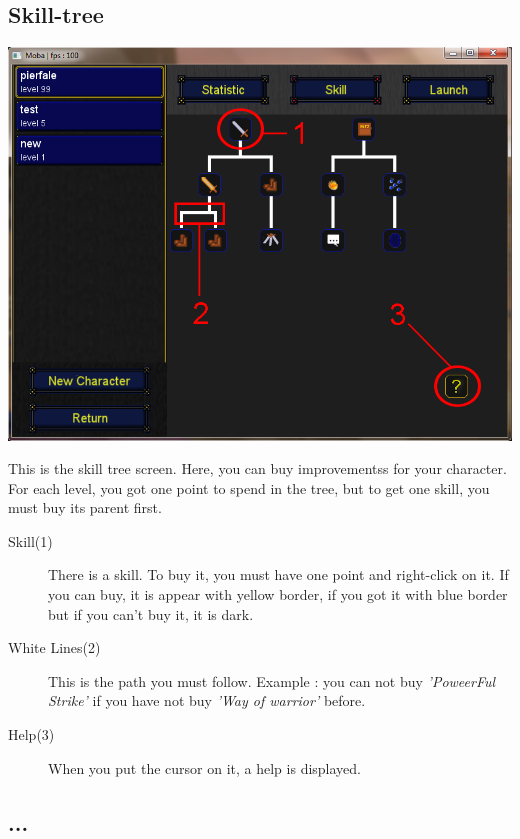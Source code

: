 \documentclass{scrreprt}
\begin{document}
			  \subsection{Skill-tree}
			  \begin{center}
			  \includegraphics[scale=0.4]{skill_tree_screen.png}
			  \end{center}
			  This is the skill tree screen. Here, you can buy improvementss for your character. For each level, you got one point to spend in the tree, but to get one skill, you must buy its parent first.
			  \begin{description}
			  \item[Skill(1)]{There is a skill. To buy it, you must have one point and right-click on it. If you can buy, it is appear with yellow border, if you got it with blue border but if you can't buy it, it is dark.}
			  \item[White Lines(2)]{This is the path you must follow. Example : you can not buy \emph{'PoweerFul Strike'} if you have not buy \emph{'Way of warrior'} before.}
			  \item[Help(3)]{When you put the cursor on it, a help is displayed.}
			  \end{description}
			  \subsection{...}
\end{document}
